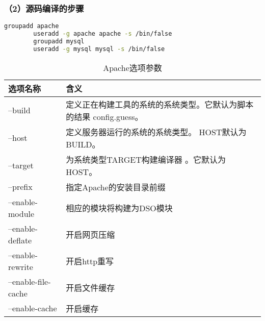 		\subsubsection{（2）源码编译的步骤}
		
		\begin{lstlisting}[language=bash]
		groupadd apache
		useradd -g apache apache -s /bin/false
		groupadd mysql
		useradd -g mysql mysql -s /bin/false
		\end{lstlisting}
		\begin{table}[!htbp]
			\centering
			\begin{tabular}{ll}	
				\toprule
				选项名称& 含义\\
				\midrule
				--build&定义正在构建工具的系统的系统类型。它默认为脚本的结果 config.guess。\\
				--host&定义服务器运行的系统的系统类型。 HOST默认为BUILD。\\
				--target&为系统类型TARGET构建编译器 。它默认为HOST。\\
				--prefix& 指定Apache的安装目录前缀\\
				--enable-module&相应的模块将构建为DSO模块\\
				--enable-deflate&开启网页压缩\\
				--enable-rewrite&开启http重写\\
				--enable-file-cache&开启文件缓存\\
				--enable-cache&开启缓存\\
				\bottomrule
			\end{tabular}
		\caption{Apache选项参数}
		\end{table}
	